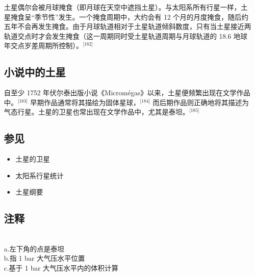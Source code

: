 土星偶尔会被月球掩食（即月球在天空中遮挡土星）。与太阳系所有行星一样，土星掩食呈“季节性”发生。一个掩食周期中，大约会有 12 个月的月度掩食，随后约五年不会再发生掩食。由于月球轨道相对于土星轨道倾斜数度，只有当土星接近两轨道交点时才会发生掩食（这一周期同时受土星轨道周期与月球轨道的 18.6 地球年交点岁差周期所控制）。\(^\text{[182]}\)
\subsection{小说中的土星}   
自至少 1752 年伏尔泰出版小说《Micromégas》以来，土星便频繁出现在文学作品中。\(^\text{[183]}\) 早期作品通常将其描绘为固体星球，\(^\text{[184]}\) 而后期作品则正确地将其描述为气态行星。土星的卫星也常出现在文学作品中，尤其是泰坦。\(^\text{[185]}\)
\subsection{参见} 
\begin{itemize}
\item 土星的卫星  
\item 太阳系行星统计  
\item 土星纲要
\end{itemize}  
\subsection{注释}\\ 
a.左下角的点是泰坦\\  
b.指 1 bar 大气压水平位置\\  
c.基于 1 bar 大气压水平内的体积计算
